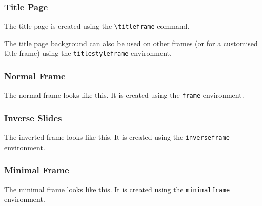 \documentclass{beamer}
\begin{document}
\begin{titlestyleframe}
\frametitle{Title Page}

\color{white} The title page is created using the \texttt{\textbackslash titleframe} command.

The title page background can also be used on other frames (or for a customised title frame) using the \texttt{titlestyleframe} environment.
\end{titlestyleframe}

\begin{frame}
\frametitle{Normal Frame}
The normal frame looks like this. It is created using the \texttt{frame} environment.
\end{frame}
\begin{inverseframe}
  \frametitle{Inverse Slides}
The inverted frame looks like this. It is created using the \texttt{inverseframe} environment.

 
\end{inverseframe}

\begin{minimalframe}
  \frametitle{Minimal Frame}
The minimal frame looks like this. It is created using the \texttt{minimalframe} environment.
  
\end{minimalframe}
\end{document}
